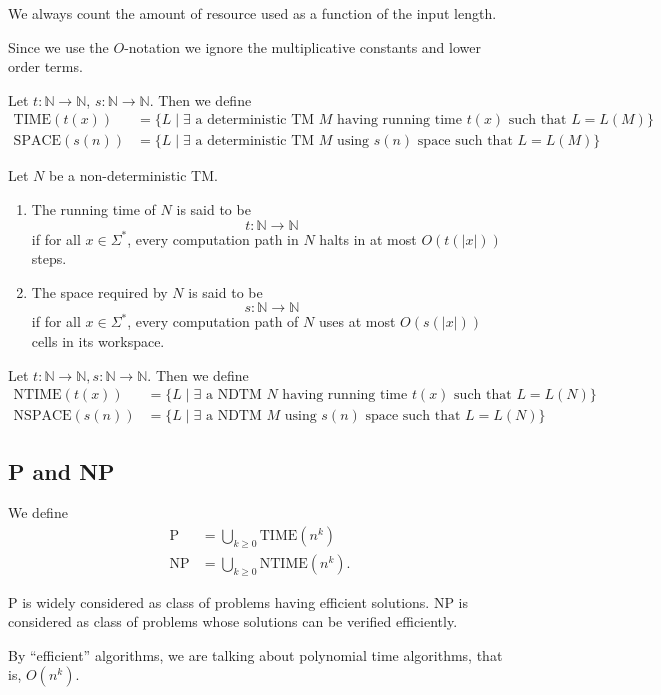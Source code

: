 \documentclass{article}
\begin{document}
We always count the amount of resource used as a function of the input length.

Since we use the $O$-notation we ignore the multiplicative constants and lower order terms.

Let $t : \mathbb{N} \to \mathbb{N}$, $s: \mathbb{N} \to \mathbb{N}$. Then we define 
\begin{align*}
  \text{TIME}(t(x)) &= \{ L \mid \exists \text{ a deterministic TM $M$ having running time } t(x) \text{ such that } L=L(M) \} \\
  \text{SPACE}(s(n)) &= \{ L \mid \exists \text{ a deterministic TM $M$ using $s(n)$ space such that } L = L(M) \}
\end{align*}

Let $N$ be a non-deterministic TM.

\begin{enumerate}
\item\label{item:56} The running time of $N$ is said to be 
\begin{displaymath}
t: \mathbb{N} \to \mathbb{N}
\end{displaymath}
if for all $x \in \Sigma^{*}$, every computation path in $N$ halts in at most $O(t(|x|))$ steps. 
\item\label{item:57} The space required by $N$ is said to be 
\begin{displaymath}
s: \mathbb{N} \to \mathbb{N}
\end{displaymath}
if for all $x\in \Sigma^{*}$, every computation path of $N$ uses at most $O(s(|x|))$ cells in its workspace.
\end{enumerate}

Let $t : \mathbb{N} \to \mathbb{N}, s: \mathbb{N} \to \mathbb{N}$. Then we define 
\begin{align*}
  \text{NTIME}(t(x)) &= \{ L \mid \exists \text{ a NDTM $N$ having running time } t(x) \text{ such that } L=L(N) \} \\
  \text{NSPACE}(s(n)) &= \{ L \mid \exists \text{ a NDTM $M$ using $s(n)$ space such that } L = L(N) \}
\end{align*}

\subsection{P and NP}

We define 
\begin{align*}
  \text{P} &= \bigcup_{k\geq 0} \text{TIME}(n^k) \\
  \text{NP} &= \bigcup_{k\geq 0} \text{NTIME}(n^k).
\end{align*}

P is widely considered as class of problems having efficient solutions. NP is considered as class of problems whose solutions can be verified efficiently.

By ``efficient'' algorithms, we are talking about polynomial time algorithms, that is, $O(n^k)$.
\end{document}
